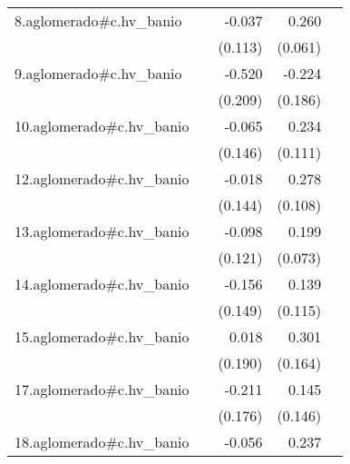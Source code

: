 {\begin{longtable}{l*{4}{D{.}{.}{-1}}}
\addlinespace
8.aglomerado#c.hv\_banio&                     &      -0.037         &       0.260\sym{***}&                     \\
            &                     &     (0.113)         &     (0.061)         &                     \\
\addlinespace
9.aglomerado#c.hv\_banio&                     &      -0.520\sym{*}  &      -0.224         &                     \\
            &                     &     (0.209)         &     (0.186)         &                     \\
\addlinespace
10.aglomerado#c.hv\_banio&                     &      -0.065         &       0.234\sym{*}  &                     \\
            &                     &     (0.146)         &     (0.111)         &                     \\
\addlinespace
12.aglomerado#c.hv\_banio&                     &      -0.018         &       0.278\sym{**} &                     \\
            &                     &     (0.144)         &     (0.108)         &                     \\
\addlinespace
13.aglomerado#c.hv\_banio&                     &      -0.098         &       0.199\sym{**} &                     \\
            &                     &     (0.121)         &     (0.073)         &                     \\
\addlinespace
14.aglomerado#c.hv\_banio&                     &      -0.156         &       0.139         &                     \\
            &                     &     (0.149)         &     (0.115)         &                     \\
\addlinespace
15.aglomerado#c.hv\_banio&                     &       0.018         &       0.301         &                     \\
            &                     &     (0.190)         &     (0.164)         &                     \\
\addlinespace
17.aglomerado#c.hv\_banio&                     &      -0.211         &       0.145         &                     \\
            &                     &     (0.176)         &     (0.146)         &                     \\
\addlinespace
18.aglomerado#c.hv\_banio&                     &      -0.056         &       0.237\sym{***}&                     \\

\end{longtable}}

